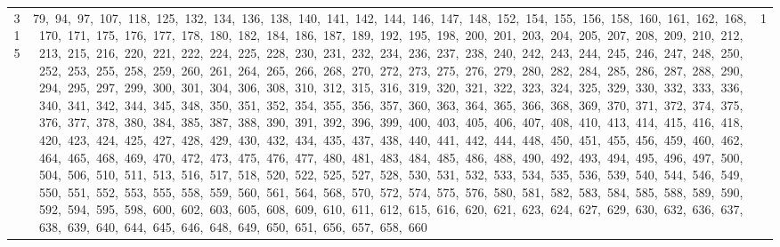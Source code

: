 \begin{longtable}{c|p{}|r}
315 & 79,\ 94,\ 97,\ 107,\ 118,\ 125,\ 132,\ 134,\ 136,\ 138,\ 140,\ 141,\ 142,\ 144,\ 146,\ 147,\ 148,\ 152,\ 154,\ 155,\ 156,\ 158,\ 160,\ 161,\ 162,\ 168,\ 170,\ 171,\ 175,\ 176,\ 177,\ 178,\ 180,\ 182,\ 184,\ 186,\ 187,\ 189,\ 192,\ 195,\ 198,\ 200,\ 201,\ 203,\ 204,\ 205,\ 207,\ 208,\ 209,\ 210,\ 212,\ 213,\ 215,\ 216,\ 220,\ 221,\ 222,\ 224,\ 225,\ 228,\ 230,\ 231,\ 232,\ 234,\ 236,\ 237,\ 238,\ 240,\ 242,\ 243,\ 244,\ 245,\ 246,\ 247,\ 248,\ 250,\ 252,\ 253,\ 255,\ 258,\ 259,\ 260,\ 261,\ 264,\ 265,\ 266,\ 268,\ 270,\ 272,\ 273,\ 275,\ 276,\ 279,\ 280,\ 282,\ 284,\ 285,\ 286,\ 287,\ 288,\ 290,\ 294,\ 295,\ 297,\ 299,\ 300,\ 301,\ 304,\ 306,\ 308,\ 310,\ 312,\ 315,\ 316,\ 319,\ 320,\ 321,\ 322,\ 323,\ 324,\ 325,\ 329,\ 330,\ 332,\ 333,\ 336,\ 340,\ 341,\ 342,\ 344,\ 345,\ 348,\ 350,\ 351,\ 352,\ 354,\ 355,\ 356,\ 357,\ 360,\ 363,\ 364,\ 365,\ 366,\ 368,\ 369,\ 370,\ 371,\ 372,\ 374,\ 375,\ 376,\ 377,\ 378,\ 380,\ 384,\ 385,\ 387,\ 388,\ 390,\ 391,\ 392,\ 396,\ 399,\ 400,\ 403,\ 405,\ 406,\ 407,\ 408,\ 410,\ 413,\ 414,\ 415,\ 416,\ 418,\ 420,\ 423,\ 424,\ 425,\ 427,\ 428,\ 429,\ 430,\ 432,\ 434,\ 435,\ 437,\ 438,\ 440,\ 441,\ 442,\ 444,\ 448,\ 450,\ 451,\ 455,\ 456,\ 459,\ 460,\ 462,\ 464,\ 465,\ 468,\ 469,\ 470,\ 472,\ 473,\ 475,\ 476,\ 477,\ 480,\ 481,\ 483,\ 484,\ 485,\ 486,\ 488,\ 490,\ 492,\ 493,\ 494,\ 495,\ 496,\ 497,\ 500,\ 504,\ 506,\ 510,\ 511,\ 513,\ 516,\ 517,\ 518,\ 520,\ 522,\ 525,\ 527,\ 528,\ 530,\ 531,\ 532,\ 533,\ 534,\ 535,\ 536,\ 539,\ 540,\ 544,\ 546,\ 549,\ 550,\ 551,\ 552,\ 553,\ 555,\ 558,\ 559,\ 560,\ 561,\ 564,\ 568,\ 570,\ 572,\ 574,\ 575,\ 576,\ 580,\ 581,\ 582,\ 583,\ 584,\ 585,\ 588,\ 589,\ 590,\ 592,\ 594,\ 595,\ 598,\ 600,\ 602,\ 603,\ 605,\ 608,\ 609,\ 610,\ 611,\ 612,\ 615,\ 616,\ 620,\ 621,\ 623,\ 624,\ 627,\ 629,\ 630,\ 632,\ 636,\ 637,\ 638,\ 639,\ 640,\ 644,\ 645,\ 646,\ 648,\ 649,\ 650,\ 651,\ 656,\ 657,\ 658,\ 660 & 1 \\

\end{longtable}
